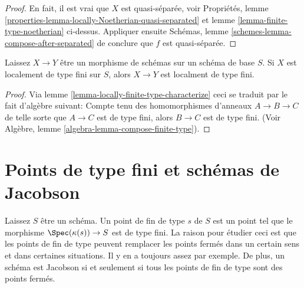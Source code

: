 \begin{proof}

En fait, il est vrai que $X$ est quasi-séparée, voir Propriétés, lemme \ref{properties-lemma-locally-Noetherian-quasi-separated}
et lemme \ref{lemma-finite-type-noetherian} ci-dessus. Appliquer ensuite Schémas, lemme \ref{schemes-lemma-compose-after-separated}
de conclure que $f$ est quasi-séparée.

\end{proof}

\begin{lemma}

\label{lemma-permanence-finite-type}
Laissez $X \to Y$ être un morphisme de schémas sur un schéma de base $S$. Si $X$ est localement de type fini sur $S$, alors $X \to Y$ est localment de type fini.
\end{lemma}

\begin{proof}
Via lemme \ref{lemma-locally-finite-type-characterize} ceci se traduit par le fait d'algèbre suivant: Compte tenu des homomorphismes d'anneaux $A \to B \to C$ de telle sorte que $A \to C$ est de type fini, alors $B \to C$ est de type fini. (Voir Algèbre, lemme \ref{algebra-lemma-compose-finite-type}).
\end{proof}







\section{Points de type fini et schémas de Jacobson}
\label{section-points-finite-type}

\noindent
Laissez $S$ être un schéma. Un point de fin de type $s$ de $S$ est un point tel que le morphisme $\Spec(\kappa(s)) \to S$ est de type fini. La raison pour étudier ceci est que les points de fin de type peuvent remplacer les points fermés dans un certain sens et dans certaines situations. Il y en a toujours assez par exemple. De plus, un schéma est Jacobson si et seulement si tous les points de fin de type sont des points fermés.

